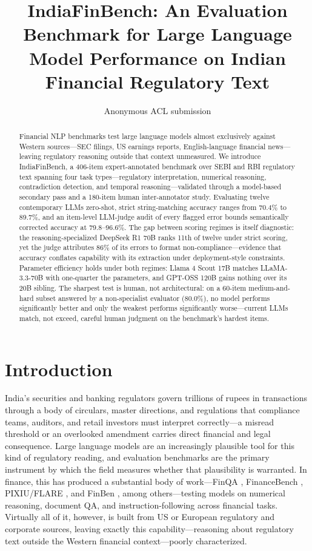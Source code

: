 \documentclass[11pt]{article}
\title{IndiaFinBench: An Evaluation Benchmark for Large Language Model Performance on Indian Financial Regulatory Text}
\author{Anonymous ACL submission}
\begin{document}
\maketitle

\begin{abstract}
Financial NLP benchmarks test large language models almost exclusively against Western sources---SEC filings, US earnings reports, English-language financial news---leaving regulatory reasoning outside that context unmeasured. We introduce IndiaFinBench, a 406-item expert-annotated benchmark over SEBI and RBI regulatory text spanning four task types---regulatory interpretation, numerical reasoning, contradiction detection, and temporal reasoning---validated through a model-based secondary pass and a 180-item human inter-annotator study. Evaluating twelve contemporary LLMs zero-shot, strict string-matching accuracy ranges from 70.4\% to 89.7\%, and an item-level LLM-judge audit of every flagged error bounds semantically corrected accuracy at 79.8--96.6\%. The gap between scoring regimes is itself diagnostic: the reasoning-specialized DeepSeek R1 70B ranks 11th of twelve under strict scoring, yet the judge attributes 86\% of its errors to format non-compliance---evidence that accuracy conflates capability with its extraction under deployment-style constraints. Parameter efficiency holds under both regimes: Llama 4 Scout 17B matches LLaMA-3.3-70B with one-quarter the parameters, and GPT-OSS 120B gains nothing over its 20B sibling. The sharpest test is human, not architectural: on a 60-item medium-and-hard subset answered by a non-specialist evaluator (80.0\%), no model performs significantly better and only the weakest performs significantly worse---current LLMs match, not exceed, careful human judgment on the benchmark's hardest items.
\end{abstract}

\section{Introduction}

India's securities and banking regulators govern trillions of rupees in transactions through a body of circulars, master directions, and regulations that compliance teams, auditors, and retail investors must interpret correctly---a misread threshold or an overlooked amendment carries direct financial and legal consequence. Large language models are an increasingly plausible tool for this kind of regulatory reading, and evaluation benchmarks are the primary instrument by which the field measures whether that plausibility is warranted. In finance, this has produced a substantial body of work---FinQA \citep{chen2021finqa}, FinanceBench \citep{islam2023financebench}, PIXIU/FLARE \citep{xie2023pixiu}, and FinBen \citep{xie2024finben}, among others---testing models on numerical reasoning, document QA, and instruction-following across financial tasks. Virtually all of it, however, is built from US or European regulatory and corporate sources, leaving exactly this capability---reasoning about regulatory text outside the Western financial context---poorly characterized.
\end{document}
